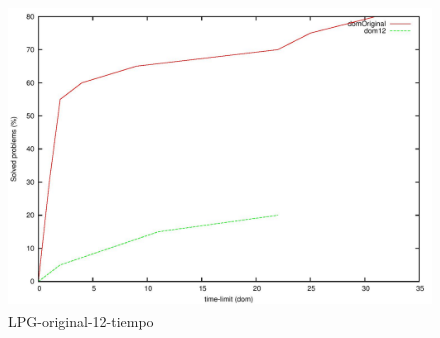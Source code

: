 \documentclass{article}
\begin{document}
    \begin{figure}[H]
        \centering
        \includegraphics[width=12cm, height=8cm]{lpg-or-12-time}
        \caption{LPG-original-12-tiempo}
    \end{figure}
    
\end{document}
